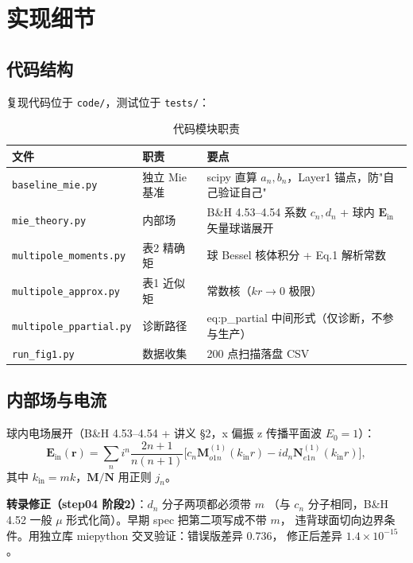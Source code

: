 \section{实现细节}

\subsection{代码结构}

复现代码位于 \texttt{code/}，测试位于 \texttt{tests/}：

\begin{table}[H]
\centering
\caption{代码模块职责}
\begin{tabular}{llp{6cm}}
\toprule
\textbf{文件} & \textbf{职责} & \textbf{要点} \\
\midrule
\texttt{baseline\_mie.py} & 独立 Mie 基准 & scipy 直算 $a_n,b_n$，Layer1 锚点，防"自己验证自己" \\
\texttt{mie\_theory.py} & 内部场 & B\&H 4.53--4.54 系数 $c_n,d_n$ + 球内 $\mathbf{E}_{\mathrm{in}}$ 矢量球谐展开 \\
\texttt{multipole\_moments.py} & 表2 精确矩 & 球 Bessel 核体积分 + Eq.1 解析常数 \\
\texttt{multipole\_approx.py} & 表1 近似矩 & 常数核（$kr\to0$ 极限） \\
\texttt{multipole\_ppartial.py} & 诊断路径 & eq:p\_partial 中间形式（仅诊断，不参与生产） \\
\texttt{run\_fig1.py} & 数据收集 & 200 点扫描落盘 CSV \\
\bottomrule
\end{tabular}
\end{table}

\subsection{内部场与电流}

球内电场展开（B\&H 4.53--4.54 + 讲义 §2，x 偏振 z 传播平面波 $E_0=1$）：
\begin{equation}
  \mathbf{E}_{\mathrm{in}}(\mathbf{r}) = \sum_n i^n\frac{2n+1}{n(n+1)}
    \bigl[c_n \mathbf{M}^{(1)}_{o1n}(k_{\mathrm{in}} r) - i d_n \mathbf{N}^{(1)}_{e1n}(k_{\mathrm{in}} r)\bigr],
  \label{eq:Ein}
\end{equation}
其中 $k_{\mathrm{in}}=mk$，$\mathbf{M}/\mathbf{N}$ 用正则 $j_n$。

\textbf{转录修正（step04 阶段2）}：$d_n$ 分子两项都必须带 $m$
（与 $c_n$ 分子相同，B\&H 4.52 一般 $\mu$ 形式化简）。早期 spec 把第二项写成不带 $m$，
违背球面切向边界条件。用独立库 miepython 交叉验证：错误版差异 0.736，
修正后差异 $1.4\times10^{-15}$。

